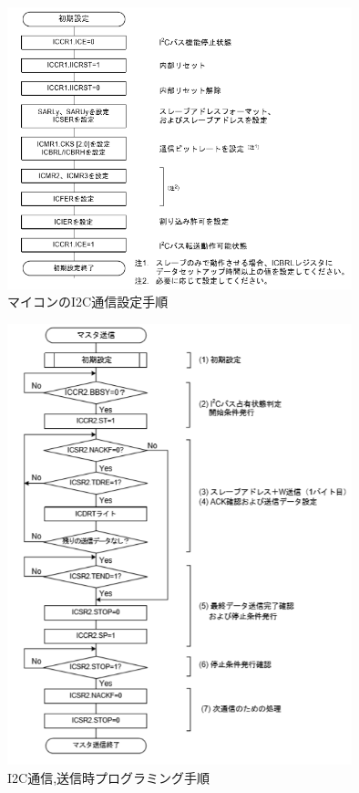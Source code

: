 \documentclass[12pt,oneside]{paper}
\begin{document}
\begin{figure}[H]
  \begin{center}
    \includegraphics[width=100mm]{ga/rx_set.png}
    \end{center}
  \caption{マイコンのI2C通信設定手順}
 \label{fig:rx_set}
\end{figure}

\begin{figure}[H]
  \begin{center}
    \includegraphics[width=100mm]{ga/rx_w.png}
    \end{center}
  \caption{I2C通信,送信時プログラミング手順}
 \label{fig:rx_w}
\end{figure}
\end{document}
